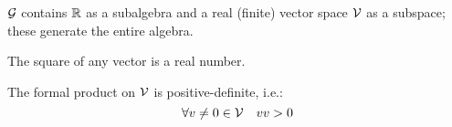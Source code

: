 \begin{axiom}
    $\mathcal{G}$ contains $\mathbb{R}$ as a subalgebra and a real (finite) vector space $\mathcal{V}$ as a subspace; these generate the entire algebra.
\end{axiom}
\begin{axiom}
    The square of any vector is a real number.
\end{axiom}
\begin{axiom}
	The formal product on $\mathcal{V}$ is positive-definite, i.e.:
\[\forall v \neq 0 \in \mathcal{V} \quad vv > 0\]
\end{axiom}
